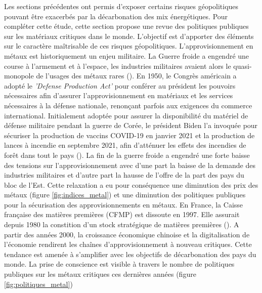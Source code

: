 Les sections précédentes ont permis d'exposer certains risques géopolitiques pouvant être exacerbés par la décarbonation des mix énergétiques. Pour compléter cette étude, cette section propose une revue des politiques publiques sur les matériaux critiques dans le monde. L'objectif est d'apporter des éléments sur le caractère maîtrisable de ces risques géopolitiques.\smallbreak
L'approvisionnement en métaux est historiquement un enjeu militaire. La Guerre froide a engendré une course à l'armement et à l'espace, les industries militaires avaient alors le quasi-monopole de l'usages des métaux rares (\cite{donnen_vers_2022}). En 1950, le Congrès américain a adopté le \textit{'Defense Production Act'} pour conférer au président les pouvoirs nécessaires afin d'assurer l'approvisionnement en matériaux et les services nécessaires à la défense nationale, renonçant parfois aux exigences du commerce international. Initialement adoptée pour assurer la disponibilité du matériel de défense militaire pendant la guerre de Corée, le président Biden l'a invoquée pour sécuriser la production de vaccins COVID-19 en janvier 2021 et la production de lances à incendie en septembre 2021, afin d'atténuer les effets des incendies de forêt dans tout le pays (\cite{iea_critical_2022}).\smallbreak
La fin de la guerre froide a engendré une forte baisse des tensions sur l'approvisionnement avec d'une part la baisse de la demande des industries militaires et d'autre part la hausse de l'offre de la part des pays du bloc de l'Est. Cette relaxation a eu pour conséquence une diminution des prix des métaux (figure \ref{fig:indices_metal}) et une diminution des politiques publiques pour la sécurisation des approvisionnements en métaux. En France, la Caisse française des matières premières (CFMP) est dissoute en 1997. Elle assurait depuis 1980 la constition d'un stock stratégique de matières premières (\cite{donnen_vers_2022}).\smallbreak
A partir des années 2000, la croissance économique chinoise et la digitalisation de l'économie rendirent les chaînes d'approvisionnement à nouveau critiques. Cette tendance est amenée à s'amplifier avec les objectifs de décarbonation des pays du monde. La prise de conscience est visible à travers le nombre de politiques publiques sur les métaux critiques ces dernières années (figure \ref{fig:politiques_metal})\smallbreak
